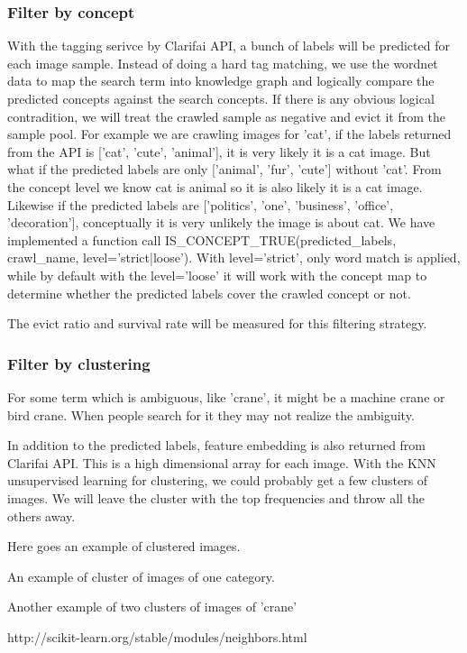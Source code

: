 \documentclass[paper=a4, fontsize=11pt]{scrartcl}
\numberwithin{equation}{section}		%
\numberwithin{figure}{section}			%
\numberwithin{table}{section}				%
\begin{document}
\subsubsection{Filter by concept}
With the tagging serivce by Clarifai API, a bunch of labels will be predicted for each image sample. Instead of doing a hard tag matching, we use the wordnet data to map the search term into knowledge graph and logically compare the predicted concepts against the search concepts. If there is any obvious logical contradition, we will treat the crawled sample as negative and evict it from the sample pool. For example we are crawling images for 'cat', if the labels returned from the API is ['cat', 'cute', 'animal'], it is very likely it is a cat image. But what if the predicted labels are only ['animal', 'fur', 'cute'] without 'cat'. From the concept level we know cat is animal so it is also likely it is a cat image. Likewise if the predicted labels are ['politics', 'one', 'business', 'office', 'decoration'], conceptually it is very unlikely the image is about cat. We have implemented a function call IS\_CONCEPT\_TRUE(predicted\_labels, crawl\_name, level='strict|loose'). With level='strict', only word match is applied, while by default with the level='loose' it will work with the concept map to determine whether the predicted labels cover the crawled concept or not. 

The evict ratio and survival rate will be measured for this filtering strategy.

\subsubsection{Filter by clustering}
For some term which is ambiguous, like 'crane', it might be a machine crane or bird crane. When people search for it they may not realize the ambiguity.

In addition to the predicted labels, feature embedding is also returned from Clarifai API. This is a high dimensional array for each image. With the KNN unsupervised learning for clustering, we could probably get a few clusters of images. We will leave the cluster with the top frequencies and throw all the others away.

Here goes an example of clustered images. 

An example of cluster of images of one category.

Another example of two clusters of images of 'crane'

http://scikit-learn.org/stable/modules/neighbors.html
\end{document}

